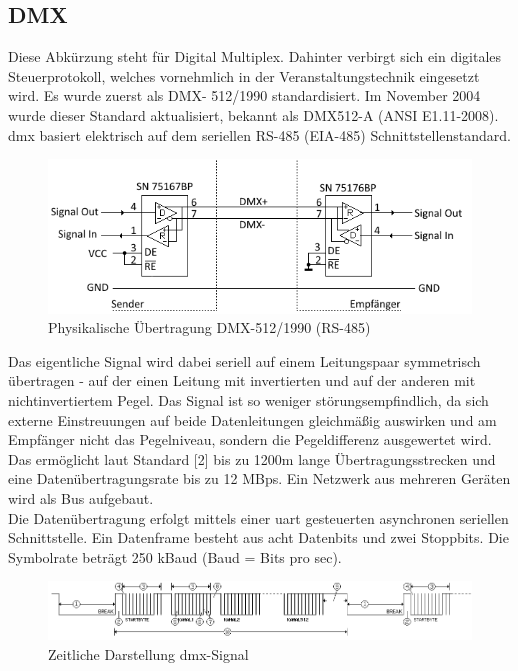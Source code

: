 \documentclass[11pt]{scrartcl}
\begin{document}
\subsection{DMX}
Diese Abkürzung steht für Digital Multiplex. Dahinter verbirgt sich ein digitales Steuerprotokoll,
welches vornehmlich in der Veranstaltungstechnik eingesetzt wird. Es wurde zuerst als DMX-
512/1990 standardisiert. Im November 2004 wurde dieser Standard aktualisiert, bekannt als
DMX512-A (ANSI E1.11-2008). \ac{dmx} basiert elektrisch auf dem seriellen RS-485 (EIA-485)
Schnittstellenstandard.\\
\begin{figure}[H]
    \includegraphics[width=\textwidth]{images/dmx.png}
    \caption{Physikalische Übertragung DMX-512/1990 (RS-485)}
\end{figure}
\noindent
Das eigentliche Signal wird dabei seriell auf einem Leitungspaar symmetrisch übertragen - auf der
einen Leitung mit invertierten und auf der anderen mit nichtinvertiertem Pegel. Das Signal ist so
weniger störungsempfindlich, da sich externe Einstreuungen auf beide Datenleitungen gleichmäßig
auswirken und am Empfänger nicht das Pegelniveau, sondern die Pegeldifferenz ausgewertet wird.
Das ermöglicht laut Standard [2] bis zu 1200m lange Übertragungsstrecken und eine
Datenübertragungsrate bis zu 12 \ac{MBps}. Ein Netzwerk aus mehreren Geräten wird als Bus aufgebaut.\\
Die Datenübertragung erfolgt mittels einer \ac{uart} gesteuerten asynchronen seriellen Schnittstelle. Ein
Datenframe besteht aus acht Datenbits und zwei Stoppbits. Die Symbolrate beträgt 250 kBaud (Baud = Bits pro sec).
\begin{figure}[H]
    \includegraphics[width=\textwidth]{images/DMX_zeitlich.png}
    \caption{Zeitliche Darstellung \ac{dmx}-Signal}
\end{figure}
\end{document}
